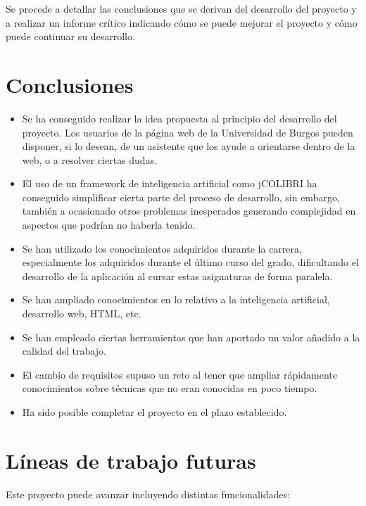 
Se procede a detallar las conclusiones que se derivan del desarrollo del proyecto y a realizar un informe crítico indicando cómo se puede mejorar el proyecto y cómo puede continuar su desarrollo.

\section{Conclusiones}

\begin{itemize}
\tightlist
\item
Se ha conseguido realizar la idea propuesta al principio del desarrollo del proyecto. Los usuarios de la página web de la Universidad de Burgos pueden disponer, si lo desean, de un asistente que los ayude a orientarse dentro de la web, o a resolver ciertas dudas.
\item
El uso de un framework de inteligencia artificial como jCOLIBRI ha conseguido simplificar cierta parte del proceso de desarrollo, sin embargo, también a ocasionado otros problemas inesperados generando complejidad en aspectos que podrían no haberla tenido.
\item
Se han utilizado los conocimientos adquiridos durante la carrera, especialmente los adquiridos durante el último curso del grado, dificultando el desarrollo de la aplicación al cursar estas asignaturas de forma paralela.
\item
Se han ampliado conocimientos en lo relativo a la inteligencia artificial, desarrollo web, HTML, etc.
\item
Se han empleado ciertas herramientas que han aportado un valor añadido a la calidad del trabajo.
\item
El cambio de requisitos supuso un reto al tener que ampliar rápidamente conocimientos sobre técnicas que no eran conocidas en poco tiempo.
\item
Ha sido posible completar el proyecto en el plazo establecido.
\end{itemize}

\section{Líneas de trabajo futuras}

Este proyecto puede avanzar incluyendo distintas funcionalidades:

